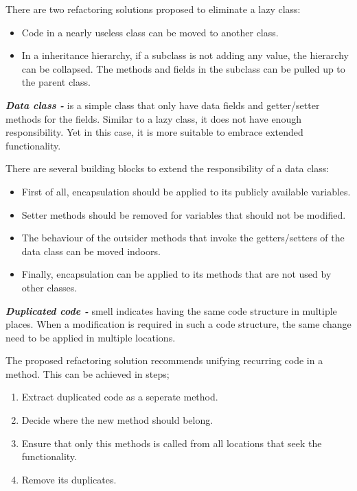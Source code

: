 There are two refactoring solutions proposed to eliminate a lazy class:

\begin{itemize}
\item Code in a nearly useless class can be moved to another class. 
\item In a inheritance hierarchy, if a subclass is not adding any value, the hierarchy can be collapsed. The methods and fields in the subclass can be pulled up to the parent class.
\end{itemize}
 
\textit{\textbf{Data class -}} is a simple class that only have data fields and getter/setter methods for the fields. Similar to a lazy class, it does not have enough responsibility. Yet in this case, it is more suitable to embrace extended functionality. 

There are several building blocks to extend the responsibility of a data class:

\begin{itemize}
\item First of all, encapsulation should be applied to its publicly available variables.
\item Setter methods should be removed for variables that should not be modified.
\item The behaviour of the outsider methods that invoke the getters/setters of the data class can be moved indoors.
\item Finally, encapsulation can be applied to its methods that are not used by other classes.
\end{itemize}

\textit{\textbf{Duplicated code -}} smell indicates having the same code structure in multiple places. When a modification is required in such a code structure, the same change need to be applied in multiple locations.

The proposed refactoring solution recommends unifying recurring code in a method. This can be achieved in steps; 
\begin{enumerate}
\item Extract duplicated code as a seperate method.
\item Decide where the new method should belong.
\item Ensure that only this methods is called from all locations that seek the functionality.
\item Remove its duplicates.
\end{enumerate}

